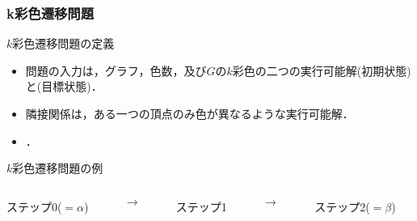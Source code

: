 \documentclass[dvipdfmx,11pt]{beamer}
\begin{document}

\begin{frame}\frametitle{k彩色遷移問題}

  \begin{block}{$k$彩色遷移問題の定義}
    \begin{itemize}
      \item 問題の入力は，グラフ，色数，及び$G$の$k$彩色の二つの実行可能解\structure{$\alpha$}(初期状態)と\structure{$\beta$}(目標状態)．
      \item 隣接関係は，ある一つの頂点のみ色が異なるような実行可能解．
      \item {}．
    \end{itemize}
  \end{block}

  \begin{exampleblock}{$k$彩色遷移問題の例}
    \begin{columns}
      \begin{column}{0.3\textwidth}
        \centering
        
        ステップ0($=\alpha$)
      \end{column}
      \begin{column}{0.05\textwidth}
        \textbf{$\longrightarrow$}
      \end{column}
      \begin{column}[]{0.3\textwidth}
        \centering
        
        ステップ1
      \end{column}
      \begin{column}{0.05\textwidth}
        \textbf{$\longrightarrow$}
      \end{column}
      \begin{column}{0.3\textwidth}
        \centering
        
        ステップ2($=\beta$)
      \end{column}
    \end{columns}
  \end{exampleblock}
  
\end{frame}

\end{document}
